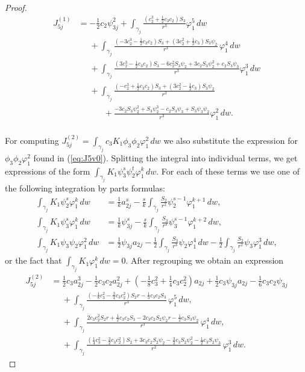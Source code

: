 \begin{proof}
\begin{align}
 J_{5j}^{(1)} &= -\frac{1}{2}c_2\psi_{3j}^2 + \int_{\gamma_j}\frac{(c_2^3+\frac{1}{2}c_3c_2)S_3}{r^3}\varphi_1^5\,dw \nonumber \\
&\phantom{=} +\int_{\gamma_j}\frac{(-3c_2^3-\frac{1}{2}c_3c_2)S_3+(3c_2^2+\frac{1}{2}c_3)S_3\psi_2}{r^3}\,\varphi_1^4\,dw \label{eq:J5(1)} \\
&\phantom{=} +\int_{\gamma_j}\frac{(3c_2^3-\frac{1}{2}c_3c_2)S_3-6c_2^2S_3\psi_2+3c_2S_3\psi_2^2+c_2S_3\psi_3}{r^3}\varphi_1^3\,dw \nonumber \\
&\phantom{=} +\int_{\gamma_j}\frac{(-c_2^3+\frac{1}{2}c_3c_2)S_3+(3c_2^2-\frac{1}{2}c_3)S_3\psi_2}{r^3}\nonumber \\
&\phantom{=\int_{\gamma_j}} + \frac{-3c_2S_3\psi_2^2+S_3\psi_2^3-c_2S_3\psi_3+S_3\psi_3\psi_2}{r^3}\varphi_1^2\,dw. \nonumber
\end{align}


For computing $J_{5j}^{(2)}=\int_{\gamma_j}c_3K_1\phi_3\phi_2\varphi_1^2\,dw$ we also substitute the expression for $\phi_3\phi_2\varphi_1^2$ found in (\ref{eq:J5v0}). Splitting the integral into individual terms, we get expressions of the form $\int_{\gamma_j}K_1\psi_3^s\psi_2^t\varphi_1^k\,dw$. For each of these terms we use one of the following integration by parts formulas:
\begin{align}
\int_{\gamma_j}K_1\psi_2^s\varphi_1^k\,dw &= \frac{1}{k}a_{2j}^s-\frac{s}{k}\int_{\gamma_j} \frac{S_2}{r^2}\psi_2^{s-1}\varphi_1^{k+1}\,dw, \nonumber \\
\int_{\gamma_j}K_1\psi_3^s\varphi_1^k\,dw &= \frac{1}{k}\psi_{3j}^s-\frac{s}{k}\int_{\gamma_j} \frac{S_3}{r^3}\psi_3^{s-1}\varphi_1^{k+2}\,dw, \label{eq:intbypartsformulas} \\
\int_{\gamma_j}K_1\psi_3\psi_2\varphi_1^2\,dw &= \frac{1}{2}\psi_{3j}a_{2j}-\frac{1}{2}\int_{\gamma_j}\frac{S_3}{r^3}\psi_2\varphi_1^4\,dw -\frac{1}{2}\int_{\gamma_j}\frac{S_2}{r^2}\psi_3\varphi_1^3\,dw, \nonumber
\end{align}
or the fact that $\int_{\gamma_j}K_1\varphi_1^k\,dw=0$. After regrouping we obtain an expression
\begin{align}
 J_{5j}^{(2)} &= \frac{1}{2}c_3a_{2j}^3-\frac{1}{2}c_3c_2a_{2j}^2 +(-\frac{1}{8}c_3^2+\frac{1}{4}c_3c_2^2)a_{2j} +\frac{1}{2}c_3\psi_{3j}a_{2j}-\frac{1}{6}c_3c_2\psi_{3j} \nonumber \\
&\phantom{=} +\int_{\gamma_j}\frac{(-\frac{1}{8}c_3^2-\frac{3}{4}c_3c_2^2)S_2r-\frac{1}{3}c_3c_2S_3}{r^3}\,\varphi_1^5\,dw, \nonumber \\
&\phantom{=} +\int_{\gamma_j}\frac{2c_3c_2^2S_2r+\frac{1}{2}c_3c_2S_3-2c_3c_2S_2\psi_2r-\frac{1}{2}c_3S_3\psi_2}{r^3}\,\varphi_1^4\,dw, \label{eq:J5(2)} \\
&\phantom{=} +\int_{\gamma_j}\frac{(\frac{1}{4}c_3^2-\frac{3}{2}c_3c_2^2)S_2+3c_3c_2S_2\psi_2-\frac{3}{2}c_3S_2\psi_2^2-\frac{1}{2}c_3S_2\psi_3}{r^2}\,\varphi_1^3\,dw. \nonumber
\end{align}


\end{proof}
